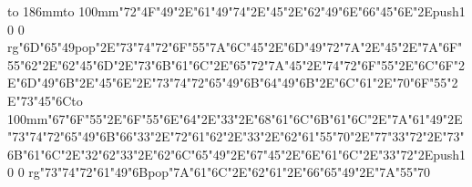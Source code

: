 \hbox to 186mm{\hsize=81mm\vbox to 100mm{\vfill\ipa\char"72\ipa\char"4F\ipa\char"49\ipa\char"2E\ipa\char"61\ipa\char"49\ipa\char"74\ipa\char"2E\ipa\char"45\ipa\char"2E\ipa\char"62\ipa\char"49\ipa\char"6E\medskip\ipa\char"66\ipa\char"45\ipa\char"6E\ipa\char"2E\pdfcolorstack\match push{1 0 0 rg}\ipa\char"6D\ipa\char"65\ipa\char"49\pdfcolorstack\match pop{}\ipa\char"2E\ipa\char"73\ipa\char"74\ipa\char"72\ipa\char"6F\ipa\char"55\ipa\char"7A\medskip\ipa\char"6C\ipa\char"45\ipa\char"2E\ipa\char"6D\ipa\char"49\ipa\char"72\ipa\char"7A\ipa\char"2E\ipa\char"45\ipa\char"2E\ipa\char"7A\ipa\char"6F\ipa\char"55\ipa\char"62\ipa\char"2E\ipa\char"62\ipa\char"45\ipa\char"6D\ipa\char"2E\ipa\char"73\ipa\char"6B\ipa\char"61\ipa\char"6C\ipa\char"2E\ipa\char"65\ipa\char"72\ipa\char"7A\medskip\ipa\char"45\ipa\char"2E\ipa\char"74\ipa\char"72\ipa\char"6F\ipa\char"55\ipa\char"2E\ipa\char"6C\ipa\char"6F\ipa\char"2E\ipa\char"6D\ipa\char"49\ipa\char"6B\ipa\char"2E\ipa\char"45\ipa\char"6E\ipa\char"2E\ipa\char"73\ipa\char"74\ipa\char"72\ipa\char"65\ipa\char"49\ipa\char"6B\medskip\ipa\char"64\ipa\char"49\ipa\char"6B\ipa\char"2E\ipa\char"6C\ipa\char"61\ipa\char"2E\ipa\char"70\ipa\char"6F\ipa\char"55\ipa\char"2E\ipa\char"73\ipa\char"45\ipa\char"6C\vfill}\hfill\vbox to 100mm{\vfill\ipa\char"67\ipa\char"6F\ipa\char"55\ipa\char"2E\ipa\char"6F\ipa\char"55\ipa\char"6E\ipa\char"64\ipa\char"2E\ipa\char"33\ipa\char"2E\ipa\char"68\ipa\char"61\ipa\char"6C\medskip\ipa\char"6B\ipa\char"61\ipa\char"6C\ipa\char"2E\ipa\char"7A\ipa\char"61\ipa\char"49\ipa\char"2E\ipa\char"73\ipa\char"74\ipa\char"72\ipa\char"65\ipa\char"49\ipa\char"6B\medskip\ipa\char"66\ipa\char"33\ipa\char"2E\ipa\char"72\ipa\char"61\ipa\char"62\ipa\char"2E\ipa\char"33\ipa\char"2E\ipa\char"62\ipa\char"61\ipa\char"55\ipa\char"70\ipa\char"2E\ipa\char"77\ipa\char"33\ipa\char"72\ipa\char"2E\ipa\char"73\ipa\char"6B\ipa\char"61\ipa\char"6C\ipa\char"2E\ipa\char"32\ipa\char"62\medskip\ipa\char"33\ipa\char"2E\ipa\char"62\ipa\char"6C\ipa\char"65\ipa\char"49\ipa\char"2E\ipa\char"67\ipa\char"45\ipa\char"2E\ipa\char"6E\ipa\char"61\ipa\char"6C\ipa\char"2E\ipa\char"33\ipa\char"72\ipa\char"2E\pdfcolorstack\match push{1 0 0 rg}\ipa\char"73\ipa\char"74\ipa\char"72\ipa\char"61\ipa\char"49\ipa\char"6B\pdfcolorstack\match pop{}\medskip\ipa\char"7A\ipa\char"61\ipa\char"6C\ipa\char"2E\ipa\char"62\ipa\char"61\ipa\char"2E\ipa\char"66\ipa\char"65\ipa\char"49\ipa\char"2E\ipa\char"7A\ipa\char"55\ipa\char"70\vfill}}\eject
